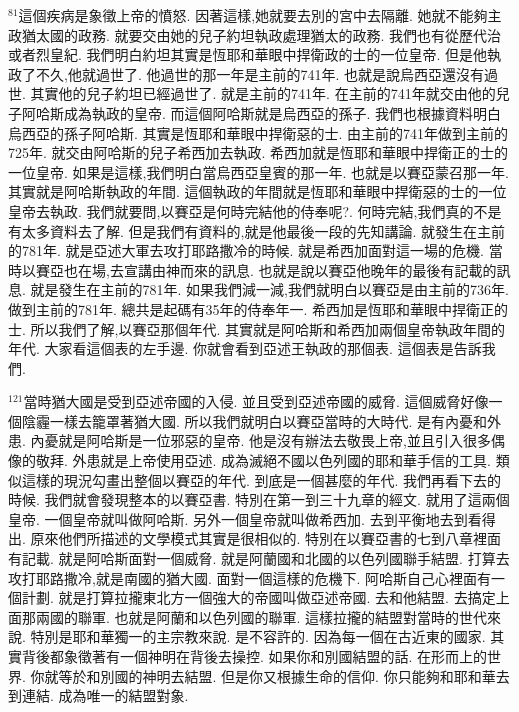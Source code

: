 \documentclass{book}
\begin{document}
$^{81}$這個疾病是象徵上帝的憤怒.
因著這樣,她就要去別的宮中去隔離.
她就不能夠主政猶太國的政務.
就要交由她的兒子約坦執政處理猶太的政務.
我們也有從歷代治或者烈皇紀.
我們明白約坦其實是恆耶和華眼中捍衛政的士的一位皇帝.
但是他執政了不久,他就過世了.
他過世的那一年是主前的741年.
也就是說烏西亞還沒有過世.
其實他的兒子約坦已經過世了.
就是主前的741年.
在主前的741年就交由他的兒子阿哈斯成為執政的皇帝.
而這個阿哈斯就是烏西亞的孫子.
我們也根據資料明白烏西亞的孫子阿哈斯.
其實是恆耶和華眼中捍衛惡的士.
由主前的741年做到主前的725年.
就交由阿哈斯的兒子希西加去執政.
希西加就是恆耶和華眼中捍衛正的士的一位皇帝.
如果是這樣,我們明白當烏西亞皇賓的那一年.
也就是以賽亞蒙召那一年.
其實就是阿哈斯執政的年間.
這個執政的年間就是恆耶和華眼中捍衛惡的士的一位皇帝去執政.
我們就要問,以賽亞是何時完結他的侍奉呢?.
何時完結,我們真的不是有太多資料去了解.
但是我們有資料的,就是他最後一段的先知講論.
就發生在主前的781年.
就是亞述大軍去攻打耶路撒冷的時候.
就是希西加面對這一場的危機.
當時以賽亞也在場,去宣講由神而來的訊息.
也就是說以賽亞他晚年的最後有記載的訊息.
就是發生在主前的781年.
如果我們減一減,我們就明白以賽亞是由主前的736年.
做到主前的781年.
總共是起碼有35年的侍奉年一.
希西加是恆耶和華眼中捍衛正的士.
所以我們了解,以賽亞那個年代.
其實就是阿哈斯和希西加兩個皇帝執政年間的年代.
大家看這個表的左手邊.
你就會看到亞述王執政的那個表.
這個表是告訴我們.

$^{121}$當時猶大國是受到亞述帝國的入侵.
並且受到亞述帝國的威脅.
這個威脅好像一個陰霾一樣去籠罩著猶大國.
所以我們就明白以賽亞當時的大時代.
是有內憂和外患.
內憂就是阿哈斯是一位邪惡的皇帝.
他是沒有辦法去敬畏上帝,並且引入很多偶像的敬拜.
外患就是上帝使用亞述.
成為滅絕不國以色列國的耶和華手信的工具.
類似這樣的現況勾畫出整個以賽亞的年代.
到底是一個甚麼的年代.
我們再看下去的時候.
我們就會發現整本的以賽亞書.
特別在第一到三十九章的經文.
就用了這兩個皇帝.
一個皇帝就叫做阿哈斯.
另外一個皇帝就叫做希西加.
去到平衡地去到看得出.
原來他們所描述的文學模式其實是很相似的.
特別在以賽亞書的七到八章裡面有記載.
就是阿哈斯面對一個威脅.
就是阿蘭國和北國的以色列國聯手結盟.
打算去攻打耶路撒冷,就是南國的猶大國.
面對一個這樣的危機下.
阿哈斯自己心裡面有一個計劃.
就是打算拉攏東北方一個強大的帝國叫做亞述帝國.
去和他結盟.
去搞定上面那兩國的聯軍.
也就是阿蘭和以色列國的聯軍.
這樣拉攏的結盟對當時的世代來說.
特別是耶和華獨一的主宗教來說.
是不容許的.
因為每一個在古近東的國家.
其實背後都象徵著有一個神明在背後去操控.
如果你和別國結盟的話.
在形而上的世界.
你就等於和別國的神明去結盟.
但是你又根據生命的信仰.
你只能夠和耶和華去到連結.
成為唯一的結盟對象.
\end{document}
